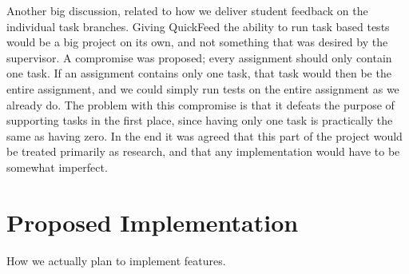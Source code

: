 Another big discussion, related to how we deliver student feedback on the individual task branches.
Giving QuickFeed the ability to run task based tests would be a big project on its own, and not something that was desired by the supervisor. 
A compromise was proposed; every assignment should only contain one task.
If an assignment contains only one task, that task would then be the entire assignment, and we could simply run tests on the entire assignment as we already do.
The problem with this compromise is that it defeats the purpose of supporting tasks in the first place, since having only one task is practically the same as having zero.
In the end it was agreed that this part of the project would be treated primarily as research, and that any implementation would have to be somewhat imperfect.


\section{Proposed Implementation}

How we actually plan to implement features.
